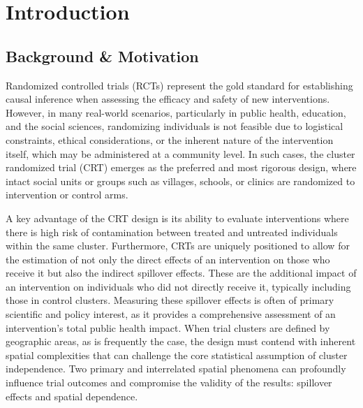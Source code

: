 \documentclass{article}[11pt]
\begin{document}
\section{Introduction}

\subsection{Background \& Motivation}

Randomized controlled trials (RCTs) represent the gold standard for establishing causal inference when assessing the efficacy and safety of new interventions\cite{pocock_clinical_1983}\cite{smith_field_2015}. However, in many real-world scenarios, particularly in public health, education, and the social sciences, randomizing individuals is not feasible due to logistical constraints, ethical considerations, or the inherent nature of the intervention itself, which may be administered at a community level. In such cases, the cluster randomized trial (CRT) emerges as the preferred and most rigorous design, where intact social units or groups such as villages, schools, or clinics are randomized to intervention or control arms\cite{hayes_cluster_2017}\cite{donner_design_2000}.

A key advantage of the CRT design is its ability to evaluate interventions where there is high risk of contamination between treated and untreated individuals within the same cluster\cite{hayes_cluster_2017}\cite{hudgens_toward_2008}. Furthermore, CRTs are uniquely positioned to allow for the estimation of not only the direct effects of an intervention on those who receive it but also the indirect spillover effects. These are the additional impact of an intervention on individuals who did not directly receive it, typically including those in control clusters. Measuring these spillover effects is often of primary scientific and policy interest, as it provides a comprehensive assessment of an intervention's total public health impact\cite{hayes_cluster_2017}\cite{hayes_design_2000}. When trial clusters are defined by geographic areas, as is frequently the case, the design must contend with inherent spatial complexities that can challenge the core statistical assumption of cluster independence. Two primary and interrelated spatial phenomena can profoundly influence trial outcomes and compromise the validity of the results: spillover effects and spatial dependence\cite{hayes_cluster_2017}\cite{smith_field_2015}.
\end{document}
